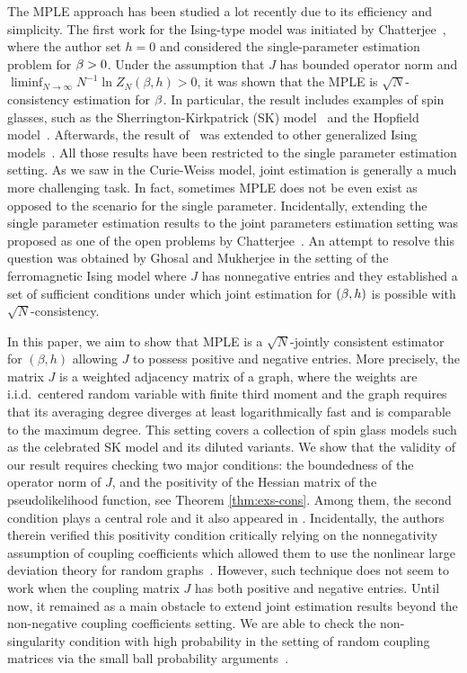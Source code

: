 \documentclass[letterpaper,11pt,reqno]{amsart}
\renewcommand{\geq}{\geqslant}
\begin{document}
The MPLE approach has been studied a lot recently due to its efficiency and simplicity. The first work for the Ising-type model was initiated by Chatterjee~\cite{Chat07}, where the author set $h=0$ and considered the single-parameter estimation problem for $\beta>0$. Under the assumption that $J$ has bounded operator norm 
and $\liminf_{N\to\infty}N^{-1}\ln Z_N(\beta,h)>0$, it was shown that the MPLE is $\sqrt{N}$-consistency estimation for $\beta$. In particular, the result includes examples of spin glasses, such as the Sherrington-Kirkpatrick (SK) model~\cite{SK75} and the Hopfield model~\cite{Hop82}. Afterwards, the result of~\cite{Chat07} was extended to other generalized Ising models~\cite{BM18,MSB22}. All those results have been restricted to the single parameter estimation setting. As we saw in the Curie-Weiss model, joint estimation is generally a much more challenging task. In fact, sometimes MPLE does not be even exist as opposed to the scenario for the single parameter. Incidentally, extending the single parameter estimation results to the joint parameters estimation setting was proposed as one of the open problems by Chatterjee~\cite{Chat07}. An attempt to resolve this question was obtained by Ghosal and Mukherjee \cite{GM20} in the setting of the ferromagnetic Ising model where $J$ has nonnegative entries and they established a set of sufficient conditions under which joint estimation for $(\beta,h)$ is possible with $\sqrt{N}$-consistency. 

 In this paper, we aim to show that MPLE is a $\sqrt{N}$-jointly consistent estimator for $(\beta,h)$ allowing $J$ to possess positive and negative entries. More precisely, the matrix $J$ is a weighted adjacency matrix of a graph, where the weights are i.i.d.\ centered random variable with finite third moment and the graph requires that its averaging degree diverges at least logarithmically fast and is comparable to the maximum degree. This setting covers a collection of spin glass models such as the celebrated SK model and its diluted variants. We show that the validity of our result requires checking two major conditions: the boundedness of the operator norm of $J$, and the positivity of the Hessian matrix of the pseudolikelihood function, see Theorem \ref{thm:exs-cons}. Among them, the second condition plays a central role and it also appeared in \cite{GM20}. Incidentally, the authors therein verified this positivity condition critically relying on the nonnegativity assumption of coupling coefficients which allowed them to use the nonlinear large deviation theory for random graphs~\cite{CD16,BM17,EG18,Chat17}. However, such technique does not seem to work when the coupling matrix $J$ has both positive and negative entries. Until now, it remained as a main obstacle to extend joint estimation results beyond the non-negative coupling coefficients setting. We are able to check the non-singularity condition with high probability in the setting of random coupling matrices via
 the small ball probability arguments~\cite{RV08, Ver14}.
 
\end{document}
